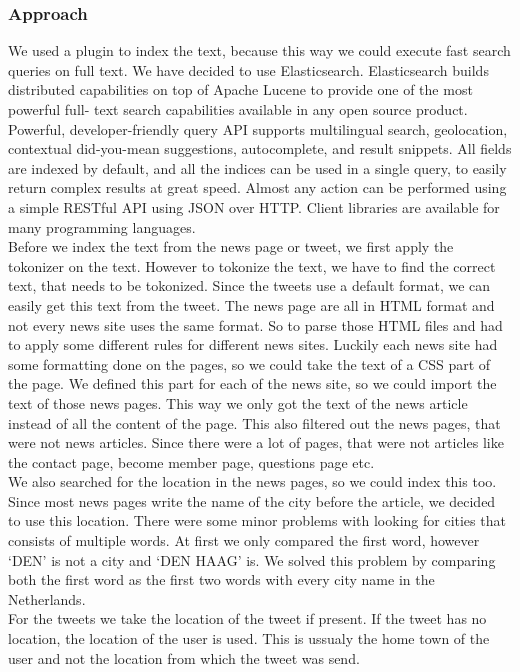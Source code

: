 \subsubsection*{Approach}
We used a plugin to index the text, because this way we could execute fast search queries on full text. 
We have decided to use Elasticsearch. 
Elasticsearch builds distributed capabilities on top of Apache Lucene to provide one of the most powerful full- text search capabilities available in any open source product. 
Powerful, developer-friendly query API supports multilingual search, geolocation, contextual did-you-mean suggestions, autocomplete, and result snippets.
All fields are indexed by default, and all the indices can be used in a single query, to easily return complex results at great speed.  
Almost any action can be performed using a simple RESTful API using JSON over HTTP. Client libraries are available for many programming languages.\\
Before we index the text from the news page or tweet, we first apply the tokonizer on the text.
However to tokonize the text, we have to find the correct text, that needs to be tokonized.
Since the tweets use a default format, we can easily get this text from the tweet. 
The news page are all in HTML format and not every news site uses the same format. 
So to parse those HTML files and had to apply some different rules for different news sites.
Luckily each news site had some formatting done on the pages, so we could take the text of a CSS part of the page. 
We defined this part for each of the news site, so we could import the text of those news pages.  
This way we only got the text of the news article instead of all the content of the page.
This also filtered out the news pages, that were not news articles. 
Since there were a lot of pages, that were not articles like the contact page, become member page, questions page etc.  \\
We also searched for the location in the news pages, so we could index this too. 
Since most news pages write the name of the city before the article, we decided to use this location.
There were some minor problems with looking for cities that consists of multiple words. 
At first we only compared the first word, however `DEN' is not a city and `DEN HAAG' is. 
We solved this problem by comparing both the first word as the first two words with every city name in the Netherlands. \\
 For the tweets we take the location of the tweet if present. 
If the tweet has no location, the location of the user is used. 
This is ussualy the home town of the user and not the location from which the tweet was send.\\ 

